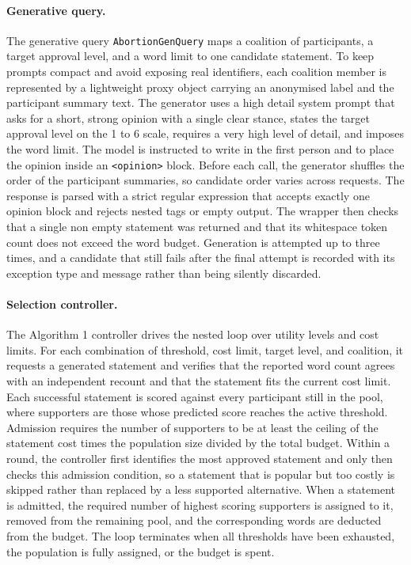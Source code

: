 \documentclass[letterpaper,11pt]{article}
\theoremstyle{plain}
\theoremstyle{definition}
\begin{document}
\paragraph{Generative query.}
The generative query \texttt{AbortionGenQuery} maps a coalition of participants, a target approval level, and a word limit to one candidate statement. To keep prompts compact and avoid exposing real identifiers, each coalition member is represented by a lightweight proxy object carrying an anonymised label and the participant summary text. The generator uses a high detail system prompt that asks for a short, strong opinion with a single clear stance, states the target approval level on the 1 to 6 scale, requires a very high level of detail, and imposes the word limit. The model is instructed to write in the first person and to place the opinion inside an \texttt{<opinion>} block. Before each call, the generator shuffles the order of the participant summaries, so candidate order varies across requests. The response is parsed with a strict regular expression that accepts exactly one opinion block and rejects nested tags or empty output. The wrapper then checks that a single non empty statement was returned and that its whitespace token count does not exceed the word budget. Generation is attempted up to three times, and a candidate that still fails after the final attempt is recorded with its exception type and message rather than being silently discarded.

\paragraph{Selection controller.}
The Algorithm 1 controller drives the nested loop over utility levels and cost limits. For each combination of threshold, cost limit, target level, and coalition, it requests a generated statement and verifies that the reported word count agrees with an independent recount and that the statement fits the current cost limit. Each successful statement is scored against every participant still in the pool, where supporters are those whose predicted score reaches the active threshold. Admission requires the number of supporters to be at least the ceiling of the statement cost times the population size divided by the total budget. Within a round, the controller first identifies the most approved statement and only then checks this admission condition, so a statement that is popular but too costly is skipped rather than replaced by a less supported alternative. When a statement is admitted, the required number of highest scoring supporters is assigned to it, removed from the remaining pool, and the corresponding words are deducted from the budget. The loop terminates when all thresholds have been exhausted, the population is fully assigned, or the budget is spent.
\end{document}
